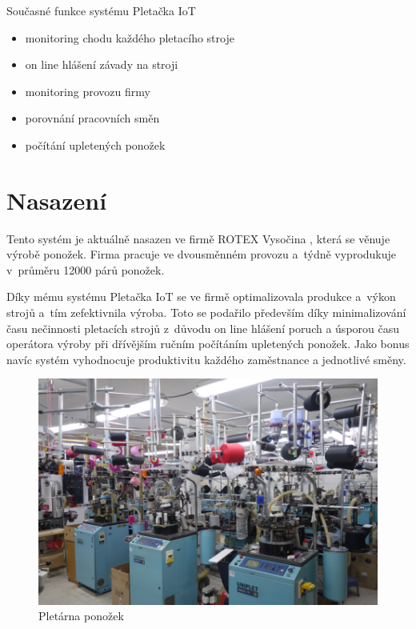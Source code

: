 Současné funkce systému Pletačka IoT
\begin{itemize}
    \item monitoring chodu každého pletacího stroje
    \item on line hlášení závady na stroji
    \item monitoring provozu firmy
    \item porovnání pracovních směn
    \item počítání upletených ponožek
\end{itemize}



\section{Nasazení}
Tento systém je aktuálně nasazen ve firmě ROTEX Vysočina \cite{ROTEX}, která se věnuje výrobě ponožek. 
Firma pracuje ve dvousměnném provozu a~týdně vyprodukuje v~průměru 12000 párů ponožek. 

Díky mému systému Pletačka IoT se ve firmě optimalizovala produkce a výkon strojů a tím zefektivnila výroba. 
Toto se podařilo především díky minimalizování času nečinnosti pletacích strojů z důvodu on line hlášení poruch a úsporou času operátora výroby při dřívějším ručním počítáním upletených ponožek. 
Jako bonus navíc systém vyhodnocuje produktivitu každého zaměstnance a jednotlivé směny.

\begin{figure}[htbp]
    \centering
    \includegraphics[width=\textwidth]{img/pletarna.png}
    \caption{Pletárna ponožek}
    \label{fig:Pletarna}
\end{figure}



\newpage

